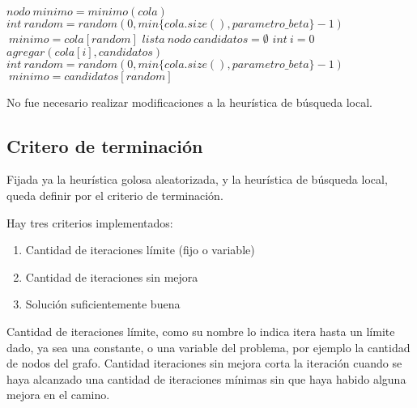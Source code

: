 \begin{algorithmic}

    	 \State $nodo \: minimo = minimo(cola)$    
		\State $int \: random = random(0, min\{cola.size(), parametro\_beta\} -1)$
		\State $ \: minimo = cola[random]$
		\State $lista \: nodo \: candidatos = \emptyset$
		\State $int \: i = 0$
				\State $ agregar(cola[i], candidatos) $
			\EndIf
		\EndWhile
		\State $int \: random = random(0, min\{cola.size(), parametro\_beta\} -1)$
		\State $ \: minimo = candidatos[random]$
		\EndIf
		
\EndWhile
\end{algorithmic}

\vspace{2mm}

No fue necesario realizar modificaciones a la heur\'istica de b\'usqueda local.

\subsection{Critero de terminaci\'on}

Fijada ya la heur\'istica golosa aleatorizada, y la heur\'istica de b\'usqueda local, queda definir por el criterio de terminaci\'on.


\vspace{2mm}

Hay tres criterios implementados:

\begin{enumerate}
\item Cantidad de iteraciones l\'imite (fijo o variable)
\item Cantidad de iteraciones sin mejora
\item Soluci\'on suficientemente buena
\end{enumerate}

Cantidad de iteraciones l\'imite, como su nombre lo indica itera hasta un l\'imite dado, ya sea una constante, o una variable del problema, por ejemplo la cantidad de nodos del grafo. Cantidad iteraciones sin mejora corta la iteraci\'on cuando se haya alcanzado una cantidad de iteraciones m\'inimas sin que haya habido alguna mejora en el camino.

\vspace{2mm}

